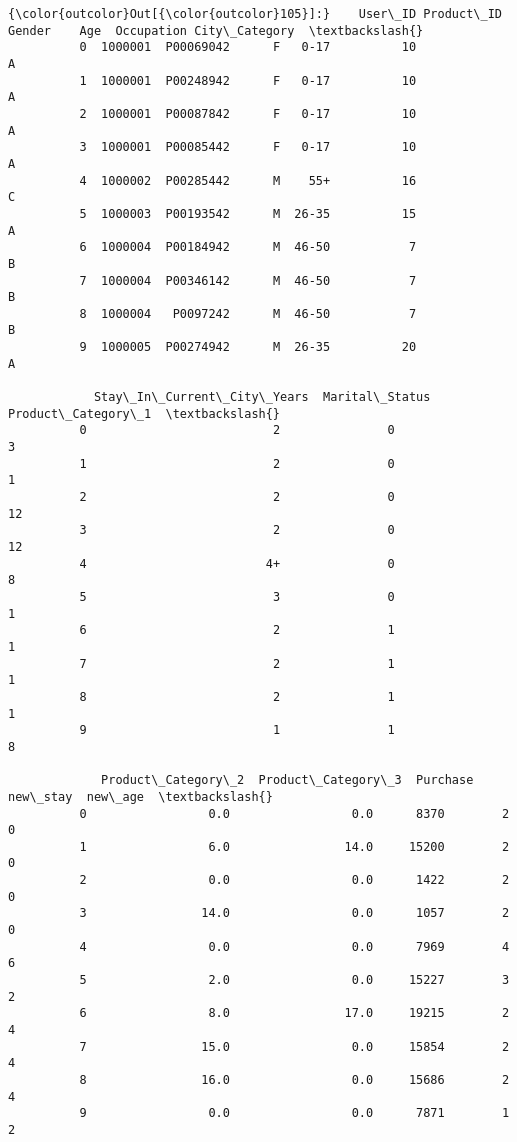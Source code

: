 \documentclass[11pt]{article}
\begin{document}
\begin{Verbatim}[commandchars=\\\{\}]
{\color{outcolor}Out[{\color{outcolor}105}]:}    User\_ID Product\_ID Gender    Age  Occupation City\_Category  \textbackslash{}
          0  1000001  P00069042      F   0-17          10             A   
          1  1000001  P00248942      F   0-17          10             A   
          2  1000001  P00087842      F   0-17          10             A   
          3  1000001  P00085442      F   0-17          10             A   
          4  1000002  P00285442      M    55+          16             C   
          5  1000003  P00193542      M  26-35          15             A   
          6  1000004  P00184942      M  46-50           7             B   
          7  1000004  P00346142      M  46-50           7             B   
          8  1000004   P0097242      M  46-50           7             B   
          9  1000005  P00274942      M  26-35          20             A   
          
            Stay\_In\_Current\_City\_Years  Marital\_Status  Product\_Category\_1  \textbackslash{}
          0                          2               0                   3   
          1                          2               0                   1   
          2                          2               0                  12   
          3                          2               0                  12   
          4                         4+               0                   8   
          5                          3               0                   1   
          6                          2               1                   1   
          7                          2               1                   1   
          8                          2               1                   1   
          9                          1               1                   8   
          
             Product\_Category\_2  Product\_Category\_3  Purchase new\_stay  new\_age  \textbackslash{}
          0                 0.0                 0.0      8370        2        0   
          1                 6.0                14.0     15200        2        0   
          2                 0.0                 0.0      1422        2        0   
          3                14.0                 0.0      1057        2        0   
          4                 0.0                 0.0      7969        4        6   
          5                 2.0                 0.0     15227        3        2   
          6                 8.0                17.0     19215        2        4   
          7                15.0                 0.0     15854        2        4   
          8                16.0                 0.0     15686        2        4   
          9                 0.0                 0.0      7871        1        2   
          

\end{Verbatim}
\end{document}
